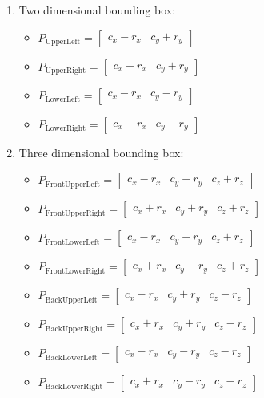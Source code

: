 \documentclass[11pt]{article}
\begin{document}
\begin{enumerate}
\item Two dimensional bounding box:
\begin{itemize}
	\item $P_{\text{UpperLeft}}=
	\begin{bmatrix}
		c_x - r_x & c_y + r_y
	\end{bmatrix}$
	\item $P_{\text{UpperRight}}=
	\begin{bmatrix}
		c_x + r_x & c_y + r_y
	\end{bmatrix}$
	\item $P_{\text{LowerLeft}}=
	\begin{bmatrix}
		c_x - r_x & c_y - r_y
	\end{bmatrix}$
	\item $P_{\text{LowerRight}}=
	\begin{bmatrix}
		c_x + r_x & c_y - r_y
	\end{bmatrix}$
\end{itemize}

\item Three dimensional  bounding box:

\begin{itemize}
	\item $P_{\text{FrontUpperLeft}}=
	\begin{bmatrix}
		c_x - r_x & c_y + r_y & c_z + r_z
	\end{bmatrix}$
	\item $P_{\text{FrontUpperRight}}=
	\begin{bmatrix}
		c_x + r_x & c_y + r_y & c_z + r_z
	\end{bmatrix}$
	\item $P_{\text{FrontLowerLeft}}=
	\begin{bmatrix}
		c_x - r_x & c_y - r_y & c_z + r_z
	\end{bmatrix}$
	\item $P_{\text{FrontLowerRight}}=
	\begin{bmatrix}
		c_x + r_x & c_y - r_y & c_z + r_z
	\end{bmatrix}$
	\item $P_{\text{BackUpperLeft}}=
	\begin{bmatrix}
		c_x - r_x & c_y + r_y & c_z - r_z
	\end{bmatrix}$
	\item $P_{\text{BackUpperRight}}=
	\begin{bmatrix}
		c_x + r_x & c_y + r_y & c_z - r_z
	\end{bmatrix}$
	\item $P_{\text{BackLowerLeft}}=
	\begin{bmatrix}
		c_x - r_x & c_y - r_y & c_z - r_z
	\end{bmatrix}$
	\item $P_{\text{BackLowerRight}}=
	\begin{bmatrix}
		c_x + r_x & c_y - r_y & c_z - r_z
	\end{bmatrix}$	
\end{itemize}
\end{enumerate}
\end{document}
